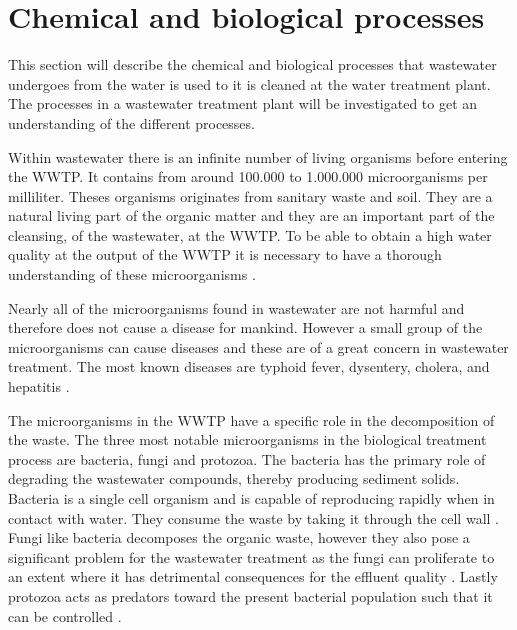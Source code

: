 \section{Chemical and biological processes}\label{se:chemical_process}
This section will describe the chemical and biological processes that wastewater undergoes from the water is used to it is cleaned at the water treatment plant. The processes in a wastewater treatment plant will be investigated to get an understanding of the different processes. %

Within wastewater there is an infinite number of living organisms before entering the WWTP. It contains from around 100.000 to 1.000.000 microorganisms per milliliter. Theses organisms originates from sanitary waste and soil. They are a natural living part of the organic matter and they are an important part of the cleansing, of the wastewater, at the WWTP. To be able to obtain a high water quality at the output of the WWTP it is necessary to have a thorough understanding of these microorganisms \cite{biological_wastewater}. %

Nearly all of the microorganisms found in wastewater are not harmful and therefore does not cause a disease for mankind. However a small group of the microorganisms can cause diseases and these are of a great concern in wastewater treatment. The most known diseases are typhoid fever, dysentery, cholera, and hepatitis \cite{biological_wastewater}.

The microorganisms in the WWTP have a specific role in the decomposition of the waste. The three most notable microorganisms in the biological treatment process are bacteria, fungi and protozoa. The bacteria has the primary role of degrading the wastewater compounds, thereby producing sediment solids. Bacteria is a single cell organism and is capable of reproducing rapidly when in contact with water. They consume the waste by taking it through the cell wall \cite{biological_wastewater}. Fungi like bacteria decomposes the organic waste, however they also pose a significant problem for the wastewater treatment as the fungi can proliferate to an extent where it has detrimental consequences for the effluent quality \cite{fungi_source}. Lastly protozoa acts as predators toward the present bacterial population such that it can be controlled \cite{biological_wastewater}. 

